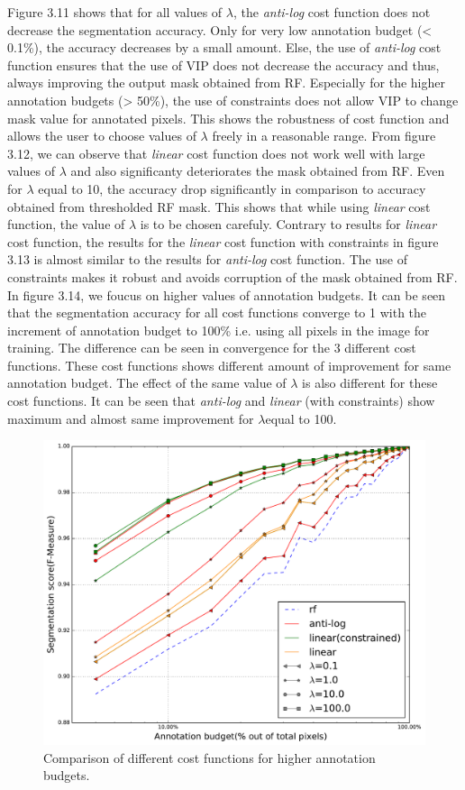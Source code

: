 Figure 3.11 shows that for all values of $\lambda$, the \textit{anti-log} cost function does not decrease the segmentation accuracy. Only for very low annotation budget (< 0.1\%), the accuracy decreases by a small amount. Else, the use of \textit{anti-log} cost function ensures that the use of VIP does not decrease the accuracy and thus, always improving the output mask obtained from RF. Especially for the higher annotation budgets (> 50\%), the use of constraints does not allow VIP to change mask value for annotated pixels. This shows the robustness of cost function and allows the user to choose values of $\lambda$ freely in a reasonable range. From figure 3.12, we can observe that \textit{linear} cost function does not work well with large values of $\lambda$ and also significanty deteriorates the mask obtained from RF. Even for $\lambda$ equal to 10, the accuracy drop significantly in comparison to accuracy obtained from thresholded RF mask. This shows that while using \textit{linear} cost function, the value of $\lambda$ is to be chosen carefuly. Contrary to results for \textit{linear} cost function, the results for the \textit{linear} cost function with constraints in figure 3.13 is almost similar to the results for \textit{anti-log} cost function. The use of constraints makes it robust and avoids corruption of the mask obtained from RF. In figure 3.14, we foucus on higher values of annotation budgets. It can be seen that the segmentation accuracy for all cost functions converge to 1 with the increment of annotation budget to 100\% i.e. using all pixels in the image for training. The difference can be seen in convergence for the 3 different cost functions. These cost functions shows different amount of improvement for same annotation budget. The effect of the same value of $\lambda$ is also different for these cost functions. It can be seen that \textit{anti-log} and \textit{linear} (with constraints) show maximum and almost same improvement for $\lambda$equal to 100.



\begin{figure}[h!] \label{fig:rf_vip_diff}
 \includegraphics[width=0.75\linewidth]{figures/vip_diff.pdf}
\caption{Comparison of different cost functions for higher annotation budgets.}
\end{figure}



